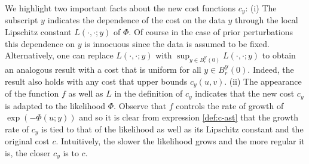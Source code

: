 \documentclass[final]{siamart171218}
\newcommand{\mcl}{\mathcal}
\newcommand{\mY}{\mcl{Y}}
\begin{document}
\begin{remark}
  We highlight two important facts about the new cost functions $c_y$: (i) The subscript 
  $y$ indicates the dependence of the cost on the data $y$ through the local Lipschitz 
  constant $L(\cdot, \cdot; y)$ of $\Phi$. Of course in the case of prior perturbations 
  this dependence on $y$ is innocuous since the data is assumed to be fixed. Alternatively, 
  one can replace $L(\cdot, \cdot;y)$ with $\sup_{y\in B^\mY_r(0)} L(\cdot, \cdot; y)$
  to obtain an analogous result with a cost that is uniform for all $y \in B^\mY_r(0)$.
  Indeed, the result also holds with any cost that upper bounds $c_y(u,v)$.
  (ii) The appearance of the function $f$ as well as $L$ in the definition of $c_y$ indicates that 
  the new cost $c_y$ is adapted to the likelihood $\Phi$. Observe that $f$ controls  the 
  rate of growth of $\exp( - \Phi(u;y))$ and so it is clear from expression 
  \eqref{def:c-ast} that the growth rate of  $c_y$ is tied to that of 
 the likelihood as well as  its Lipschitz constant and the original cost $c$. Intuitively, the slower the 
 likelihood grows and the more regular it is, the closer $c_y$ is to $c$.
\end{remark}
\end{document}
